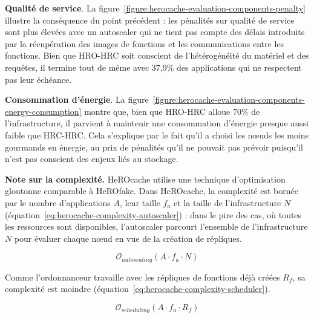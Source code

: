 {\textbf{Qualité de service}. La figure~\ref{figure:herocache-evaluation-components-penalty} illustre la conséquence du point précédent : les pénalités sur qualité de service sont plus élevées avec un autoscaler qui ne tient pas compte des délais introduits par la récupération des images de fonctions et les communications entre les fonctions. Bien que HRO-HRC soit conscient de l'hétérogénéité du matériel et des requêtes, il termine tout de même avec 37,9\% des applications qui ne respectent pas leur échéance.

\textbf{Consommation d'énergie}. La figure~\ref{figure:herocache-evaluation-components-energy-consumption} montre que, bien que HRO-HRC alloue 70\% de l'infrastructure, il parvient à maintenir une consommation d'énergie presque aussi faible que HRC-HRC. Cela s'explique par le fait qu'il a choisi les nœuds les moins gourmands en énergie, au prix de pénalités qu'il ne pouvait pas prévoir puisqu'il n'est pas conscient des enjeux liés au stockage.

\textbf{Note sur la complexité.} HeROcache utilise une technique d'optimisation gloutonne comparable à HeROfake. Dans HeROcache, la complexité est bornée par le nombre d'applications $A$, leur taille $f_{a}$ et la taille de l'infrastructure $N$ (équation~\ref{eq:herocache-complexity-autoscaler}) : dans le pire des cas, où toutes les ressources sont disponibles, l'autoscaler parcourt l'ensemble de l'infrastructure $N$ pour évaluer chaque nœud en vue de la création de répliques.

\begin{equation}
    \mathcal{O}_{autoscaling}(A \cdot f_{a} \cdot N)
\label{eq:herocache-complexity-autoscaler}
\end{equation}

Comme l'ordonnanceur travaille avec les répliques de fonctions déjà créées $R_{f}$, sa complexité est moindre (équation~\ref{eq:herocache-complexity-scheduler}).

\begin{equation}
    \mathcal{O}_{scheduling}(A \cdot f_{a} \cdot R_{f})
\label{eq:herocache-complexity-scheduler}
\end{equation}

}

